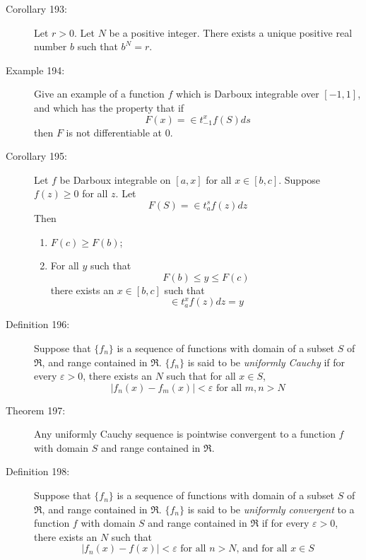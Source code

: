 \documentclass{article}
\begin{document}
\begin{description}
  \item[Corollary 193:] Let $r > 0$. Let $N$ be a positive integer. There exists a unique positive real number $b$ such that $b^{N} = r$. 

  \item[Example 194:] Give an example of a function $f$ which is Darboux integrable over $[-1,1]$, and which has the property that if
    \begin{equation*}
    F(x) = \in t_{-1}^{x} f(S) ds
    \end{equation*}
    then $F$ is not differentiable at $0$. 

  \item[Corollary 195:] Let $f$ be Darboux integrable on $[a,x]$ for all $x \in [b,c]$. Suppose $f(z) \geq 0$ for all $z$. Let
    \begin{equation*}
      F(S) = \in t_{a}^{s} f(z) dz
    \end{equation*}
    Then
    \begin{enumerate}
      \item $F(c) \geq F(b)$; 
      \item For all $y$ such that
        \begin{equation*}
          F(b) \leq y \leq F(c)
        \end{equation*}
        there exists an $x \in [b,c]$ such that
        \begin{equation*}
          \in t_{a}^{x} f(z) dz = y
        \end{equation*}
    \end{enumerate}

  \item[Definition 196:] Suppose that $\{ f_{n} \}$ is a sequence of functions with domain of a subset $S$ of $\Re$, and range contained in $\Re$. $\{ f_{n} \}$ is said to be \emph{uniformly Cauchy} if for every $\varepsilon > 0$, there exists an $N$ such that for all $x \in S$,
    \begin{equation*}
    |f_{n}(x) - f_{m}(x)| < \varepsilon \text{ for all } m,n > N
    \end{equation*}

  \item[Theorem 197:] Any uniformly Cauchy sequence is pointwise convergent to a function $f$ with domain $S$ and range contained in $\Re$. 

  \item[Definition 198:] Suppose that $\{ f_{n} \}$ is a sequence of functions with domain of a subset $S$ of $\Re$, and range contained in $\Re$. $\{ f_{n} \}$ is said to be \emph{uniformly convergent} to a function $f$ with domain $S$ and range contained in $\Re$ if for every $\varepsilon > 0$, there exists an $N$ such that
    \begin{equation*}
    |f_{n}(x) - f(x)| < \varepsilon \text{ for all } n > N \text{, and for all } x \in S
    \end{equation*}


\end{description}
\end{document}
